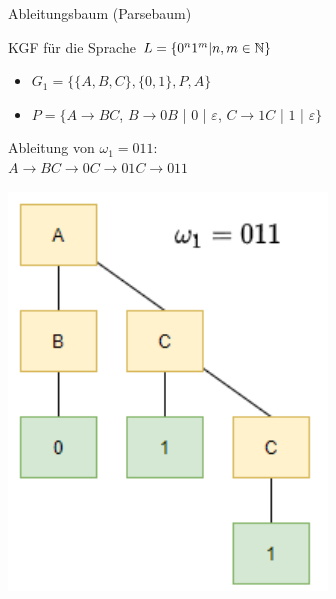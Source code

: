 \begin{minipage}{0.8\linewidth}
    \begin{definition}{Ableitungsbaum (Parsebaum)} 
        
        KGF für die Sprache $L=\{0^{n} 1^{m} | n, m \in \mathbb{N}\}$
        \begin{itemize}
        \item $G_{1}=\{\{A, B, C\},\{0,1\}, P, A\}$
        \item $P=\{A \rightarrow B C$, $B \rightarrow 0 B$ | $0$ | $\varepsilon$, $C \rightarrow 1 C$ | $1$ | $\varepsilon\}$
        \end{itemize}
        Ableitung von $\omega_{1}=011$:\\ $A \rightarrow B C \rightarrow 0 C \rightarrow 01 C \rightarrow 011$
    \end{definition}
\end{minipage}
\begin{minipage}{0.2\linewidth}
    \includegraphics[width=1\linewidth]{images/ableitungsbaum.png}
\end{minipage}





